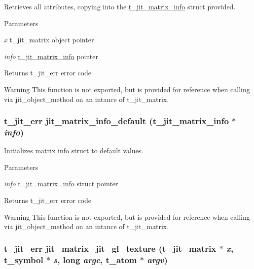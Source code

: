 Retrieves all attributes, copying into the \hyperlink{structt__jit__matrix__info}{t\_\-jit\_\-matrix\_\-info} struct provided. 
\begin{DoxyParams}{Parameters}
\item[{\em x}]t\_\-jit\_\-matrix object pointer \item[{\em info}]\hyperlink{structt__jit__matrix__info}{t\_\-jit\_\-matrix\_\-info} pointer\end{DoxyParams}
\begin{DoxyReturn}{Returns}
t\_\-jit\_\-err error code
\end{DoxyReturn}
\begin{DoxyWarning}{Warning}
This function is not exported, but is provided for reference when calling via jit\_\-object\_\-method on an intance of t\_\-jit\_\-matrix. 
\end{DoxyWarning}
\hypertarget{group__matrixmod_ga9c068d7781425345e99576a1955366af}{
\subsubsection[{jit\_\-matrix\_\-info\_\-default}]{\setlength{\rightskip}{0pt plus 5cm}t\_\-jit\_\-err jit\_\-matrix\_\-info\_\-default ({\bf t\_\-jit\_\-matrix\_\-info} $\ast$ {\em info})}}
\label{group__matrixmod_ga9c068d7781425345e99576a1955366af}


Initializes matrix info struct to default values. 
\begin{DoxyParams}{Parameters}
\item[{\em info}]\hyperlink{structt__jit__matrix__info}{t\_\-jit\_\-matrix\_\-info} struct pointer\end{DoxyParams}
\begin{DoxyReturn}{Returns}
t\_\-jit\_\-err error code
\end{DoxyReturn}
\begin{DoxyWarning}{Warning}
This function is not exported, but is provided for reference when calling via jit\_\-object\_\-method on an intance of t\_\-jit\_\-matrix. 
\end{DoxyWarning}
\hypertarget{group__matrixmod_gae640384806be8bb78a2cb0118c629a0f}{
\subsubsection[{jit\_\-matrix\_\-jit\_\-gl\_\-texture}]{\setlength{\rightskip}{0pt plus 5cm}t\_\-jit\_\-err jit\_\-matrix\_\-jit\_\-gl\_\-texture (t\_\-jit\_\-matrix $\ast$ {\em x}, \/  {\bf t\_\-symbol} $\ast$ {\em s}, \/  long {\em argc}, \/  {\bf t\_\-atom} $\ast$ {\em argv})}}
\label{group__matrixmod_gae640384806be8bb78a2cb0118c629a0f}


